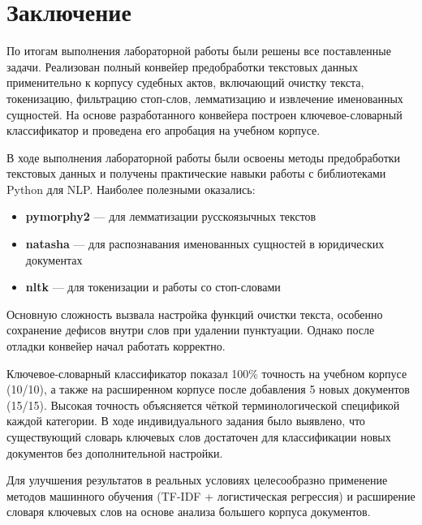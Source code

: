 \documentclass[12pt, a4paper]{report}
\begin{document}
\chapter{Заключение}

По итогам выполнения лабораторной работы были решены все поставленные задачи.
Реализован полный конвейер предобработки текстовых данных применительно к корпусу
судебных актов, включающий очистку текста, токенизацию, фильтрацию стоп-слов,
лемматизацию и извлечение именованных сущностей. На основе разработанного конвейера
построен ключевое-словарный классификатор и проведена его апробация на учебном корпусе.

\begin{tcolorbox}[infobox, title={Собственные выводы студента}]
В ходе выполнения лабораторной работы были освоены методы предобработки текстовых данных
и получены практические навыки работы с библиотеками Python для NLP. Наиболее полезными
оказались:

\begin{itemize}
  \item \textbf{pymorphy2} — для лемматизации русскоязычных текстов
  \item \textbf{natasha} — для распознавания именованных сущностей в юридических документах
  \item \textbf{nltk} — для токенизации и работы со стоп-словами
\end{itemize}

Основную сложность вызвала настройка функций очистки текста, особенно сохранение дефисов
внутри слов при удалении пунктуации. Однако после отладки конвейер начал работать корректно.

Ключевое-словарный классификатор показал 100\% точность на учебном корпусе (10/10), а также
на расширенном корпусе после добавления 5 новых документов (15/15). Высокая точность
объясняется чёткой терминологической спецификой каждой категории. В ходе индивидуального
задания было выявлено, что существующий словарь ключевых слов достаточен для классификации
новых документов без дополнительной настройки.

Для улучшения результатов в реальных условиях целесообразно применение методов машинного
обучения (TF-IDF + логистическая регрессия) и расширение словаря ключевых слов на основе
анализа большего корпуса документов.
\end{tcolorbox}
\end{document}
